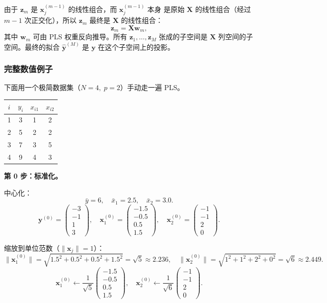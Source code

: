 由于 $\mathbf{z}_m$ 是 $\mathbf{x}_j^{(m-1)}$ 的线性组合，而 $\mathbf{x}_j^{(m-1)}$ 本身
是原始 $\mathbf{X}$ 的线性组合（经过 $m-1$ 次正交化），所以 $\mathbf{z}_m$ 最终是 $\mathbf{X}$ 的线性组合：
\[
    \mathbf{z}_m = \mathbf{X} \mathbf{w}_m,
\]
其中 $\mathbf{w}_m$ 可由 PLS 权重反向推导。所有 $\mathbf{z}_1, \dots, \mathbf{z}_M$ 张成的子空间是
$\mathbf{X}$ 列空间的子空间。最终的拟合 $\hat{\mathbf{y}}^{(M)}$ 是 $\mathbf{y}$ 在这个子空间上的投影。

\subsubsection{完整数值例子}

下面用一个极简数据集（$N=4,\; p=2$）手动走一遍 PLS。

\begin{center}
\renewcommand{\arraystretch}{1.3}
\begin{tabular}{c|ccc}
\toprule
$i$ & $y_i$ & $x_{i1}$ & $x_{i2}$ \\
\midrule
1 & 3  & 1 & 2 \\
2 & 5  & 2 & 2 \\
3 & 7  & 3 & 5 \\
4 & 9  & 4 & 3 \\
\bottomrule
\end{tabular}
\end{center}

\medskip
\noindent
\textbf{第 0 步：标准化。}

中心化：
\[
\bar{y} = 6,\quad \bar{x}_1 = 2.5,\quad \bar{x}_2 = 3.0.
\]
\[
\mathbf{y}^{(0)} = \begin{pmatrix} -3 \\ -1 \\ 1 \\ 3 \end{pmatrix},\quad
\mathbf{x}_1^{(0)} = \begin{pmatrix} -1.5 \\ -0.5 \\ 0.5 \\ 1.5 \end{pmatrix},\quad
\mathbf{x}_2^{(0)} = \begin{pmatrix} -1 \\ -1 \\ 2 \\ 0 \end{pmatrix}.
\]

缩放到单位范数（$\|\mathbf{x}_j\| = 1$）：
\[
\|\mathbf{x}_1^{(0)}\| = \sqrt{1.5^2 + 0.5^2 + 0.5^2 + 1.5^2} = \sqrt{5} \approx 2.236,\quad
\|\mathbf{x}_2^{(0)}\| = \sqrt{1^2 + 1^2 + 2^2 + 0^2} = \sqrt{6} \approx 2.449.
\]
\[
\mathbf{x}_1^{(0)} \leftarrow \frac{1}{\sqrt{5}}\begin{pmatrix} -1.5 \\ -0.5 \\ 0.5 \\ 1.5 \end{pmatrix},\quad
\mathbf{x}_2^{(0)} \leftarrow \frac{1}{\sqrt{6}}\begin{pmatrix} -1 \\ -1 \\ 2 \\ 0 \end{pmatrix}.
\]

